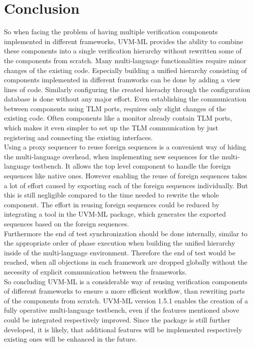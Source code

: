 \section{Conclusion}\label{conclusion}
So when facing the problem of having multiple verification components implemented in different frameworks, UVM-ML provides the ability to combine these components into a single verification hierarchy without rewritten some of the components from scratch. Many multi-language functionalities require minor changes of the existing code. Especially building a unified hierarchy consisting of components implemented in different framworks can be done by adding a view lines of code. Similarly configuring the created hierachy through the configuration database is done without any major effort. Even establishing the communication between components using TLM ports, requires only slight changes of the existing code. Often components like a monitor already contain TLM ports, which makes it even simpler to set up the TLM communication by just registering and connecting the existing interfaces.\\
Using a proxy sequencer to reuse foreign sequences is a convenient way of hiding the multi-language overhead, when implementing new sequences for the multi-language testbench. It allows the top level component to handle the foreign sequences like native ones. However enabling the reuse of foreign sequences takes a lot of effort caused by exporting each of the foreign sequences individually. But this is still negligible compared to the time needed to rewrite the whole component. The effort in reusing foreign sequences could be reduced by integrating a tool in the UVM-ML package, which generates the exported sequences based on the foreign sequences.\\
Furthermore the end of test synchronization should be done internally, similar to the appropriate order of phase execution when building the unified hierarchy inside of the multi-language environment. Therefore the end of test would be reached, when all objections in each framework are dropped globally without the necessity of explicit communication between the frameworks.\\
So concluding UVM-ML is a considerable way of reusing verification components of different frameworks to ensure a more efficient workflow, than rewriting parts of the components from scratch. UVM-ML version 1.5.1 enables the creation of a fully operative multi-language testbench, even if the features mentioned above could be integrated respectively improved.
Since the package is still further developed, it is likely, that additional features will be implemented respectively existing ones will be enhanced in the future.